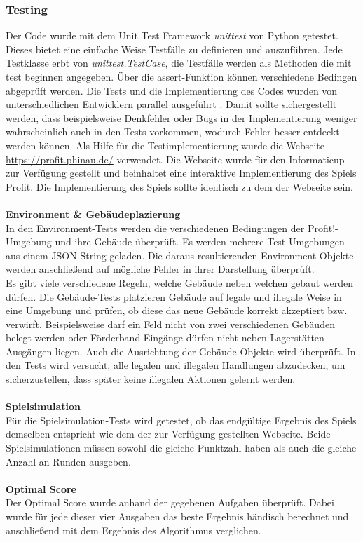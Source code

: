 \subsubsection*{Testing}
Der Code wurde mit dem Unit Test Framework \textit{unittest} von Python getestet. Dieses bietet eine einfache Weise Testfälle zu definieren und auszuführen. 
Jede Testklasse erbt von \textit{unittest.TestCase}, die Testfälle werden als Methoden die mit test beginnen angegeben. Über die assert-Funktion können verschiedene Bedingen abgeprüft werden.
Die Tests und die Implementierung des Codes wurden von unterschiedlichen Entwicklern parallel ausgeführt . Damit sollte sichergestellt werden, dass beispielsweise Denkfehler oder Bugs in der Implementierung weniger wahrscheinlich auch in den Tests vorkommen, wodurch Fehler besser entdeckt werden können. 
Als Hilfe für die Testimplementierung wurde die Webseite \url{https://profit.phinau.de/}  verwendet. Die Webseite wurde für den Informaticup zur Verfügung gestellt und beinhaltet eine interaktive Implementierung des Spiels Profit. Die Implementierung des Spiels sollte identisch zu dem der Webseite sein.
\\\\
\textbf{Environment \& Gebäudeplazierung}\\
In den Environment-Tests werden die verschiedenen Bedingungen der \dq{}Profit!\dq{}-Umgebung und ihre Gebäude überprüft.
Es werden mehrere Test-Umgebungen aus einem JSON-String geladen. Die daraus resultierenden Environment-Objekte werden anschließend auf mögliche Fehler in ihrer Darstellung überprüft.
\\
Es gibt viele verschiedene Regeln, welche Gebäude neben welchen gebaut werden dürfen. Die Gebäude-Tests platzieren Gebäude auf legale und illegale Weise in eine Umgebung und prüfen, ob diese das neue Gebäude korrekt akzeptiert bzw. verwirft. 
Beispielsweise darf ein Feld nicht von zwei verschiedenen Gebäuden belegt werden oder Förderband-Eingänge dürfen nicht neben Lagerstätten-Ausgängen liegen. Auch die Ausrichtung der Gebäude-Objekte wird überprüft.
In den Tests wird versucht, alle legalen und illegalen Handlungen abzudecken, um sicherzustellen, dass später keine illegalen Aktionen gelernt werden. 
\\\\
\textbf{Spielsimulation}\\
Für die Spielsimulation-Tests wird getestet, ob das endgültige Ergebnis des Spiels demselben entspricht wie dem der zur Verfügung gestellten Webseite. Beide Spielsimulationen müssen sowohl die gleiche Punktzahl haben als auch die gleiche Anzahl an Runden ausgeben. 
\\\\
\textbf{Optimal Score}\\
Der Optimal Score wurde anhand der gegebenen Aufgaben überprüft. Dabei wurde für jede dieser vier Ausgaben das beste Ergebnis händisch berechnet und anschließend mit dem Ergebnis des Algorithmus verglichen.



